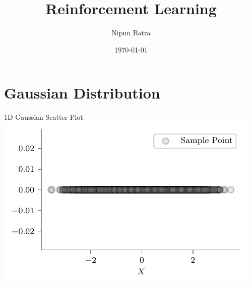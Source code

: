 \documentclass{beamer}
\title{Reinforcement Learning}
\date{\today}
\author{Nipun Batra}
\institute{IIT Gandhinagar}
\begin{document}
	\maketitle
	
	
	
	\section{Gaussian Distribution}
	\begin{frame}{1D Gaussian Scatter Plot}
		\includegraphics[width=\linewidth,height=\textheight,keepaspectratio]{gp/1d-gp}
	\end{frame}
	
	
\end{document}
